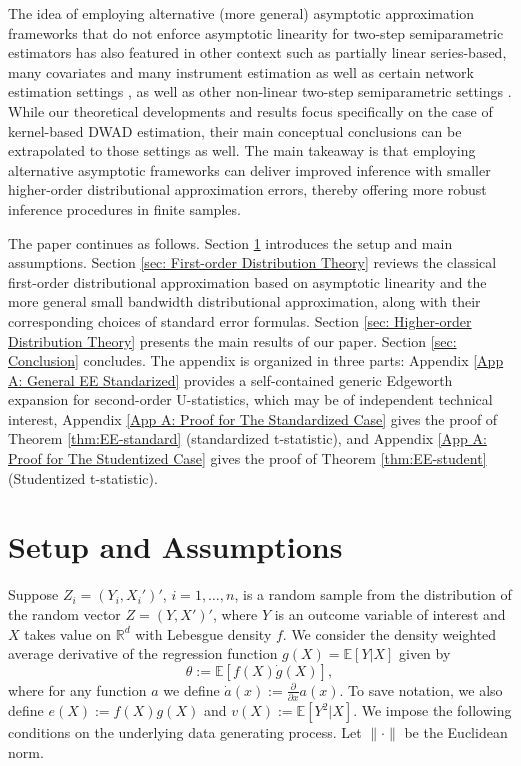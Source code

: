 \documentclass[11pt]{article}
\numberwithin{equation}{section}
\theoremstyle{definition}
\newcommand{\E}{\mathbb{E}}
\newcommand{\R}{\mathbb{R}}
\begin{document}
The idea of employing alternative (more general) asymptotic approximation frameworks that do not enforce asymptotic linearity for two-step semiparametric estimators has also featured in other context such as partially linear series-based, many covariates and many instrument estimation as well as certain network estimation settings \citep{Cattaneo-Jansson-Newey_2018_ET,Cattaneo-Jansson-Newey_2018_JASA,Matsushita-Otsu_2021_Biometrika}, as well as other non-linear two-step semiparametric settings \citep{Cattaneo-Crump-Jansson_2013_JASA,Cattaneo-Jansson_2018_ECMA,Cattaneo-Jansson-Ma_2019_RESTUD}. While our theoretical developments and results focus specifically on the case of kernel-based DWAD estimation, their main conceptual conclusions can be extrapolated to those settings as well. The main takeaway is that employing alternative asymptotic frameworks can deliver improved inference with smaller higher-order distributional approximation errors, thereby offering more robust inference procedures in finite samples. 

The paper continues as follows. Section \ref{sec: Setup} introduces the setup and main assumptions. Section \ref{sec: First-order Distribution Theory} reviews the classical first-order distributional approximation based on asymptotic linearity and the more general small bandwidth distributional approximation, along with their corresponding choices of standard error formulas. Section \ref{sec: Higher-order Distribution Theory} presents the main results of our paper. Section \ref{sec: Conclusion} concludes. The appendix is organized in three parts: Appendix \ref{App A: General EE Standarized} provides a self-contained generic Edgeworth expansion for second-order U-statistics, which may be of independent technical interest, Appendix \ref{App A: Proof for The Standardized Case} gives the proof of Theorem \ref{thm:EE-standard} (standardized t-statistic), and Appendix \ref{App A: Proof for The Studentized Case} gives the proof of Theorem \ref{thm:EE-student} (Studentized t-statistic).

\section{Setup and Assumptions}\label{sec: Setup}

Suppose $Z_i=(Y_i, X_i')'$, $i = 1,\dots,n$, is a random sample from the distribution of the random vector $Z=(Y, X')'$, where $Y$ is an outcome variable of interest and $X$ takes value on $\R^d$ with Lebesgue density $f$. We consider the density weighted average derivative of the regression function $g(X) = \E[Y|X]$ given by
\begin{equation*}
    \theta := \E[f(X)\dot{g}(X)],
\end{equation*}
where for any function $a$ we define $\dot{a}(x):= \frac{\partial}{\partial x}a(x)$. To save notation, we also define $e(X) := f(X)g(X)$ and $v(X) := \E[Y^2|X]$. We impose the following conditions on the underlying data generating process. Let $\|\cdot\|$ be the Euclidean norm.
\end{document}
